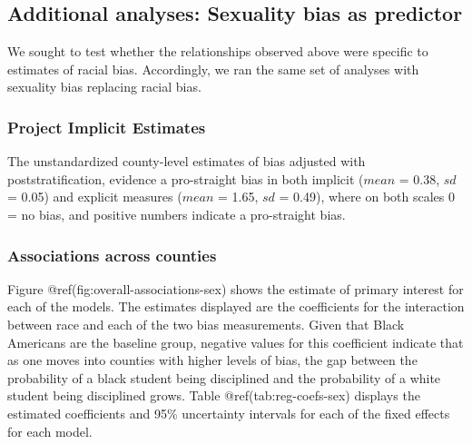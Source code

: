 \documentclass[9pt,twocolumn,twoside,lineno]{pnas-new}
\begin{document}
\subsection{Additional analyses: Sexuality bias as
predictor}\label{additional-analyses-sexuality-bias-as-predictor}

We sought to test whether the relationships observed above were specific
to estimates of racial bias. Accordingly, we ran the same set of
analyses with sexuality bias replacing racial bias.

\subsubsection{Project Implicit
Estimates}\label{project-implicit-estimates-1}

The unstandardized county-level estimates of bias adjusted with
poststratification, evidence a pro-straight bias in both implicit
(\(mean\) = 0.38, \(sd\) = 0.05) and explicit measures (\(mean\) = 1.65,
\(sd\) = 0.49), where on both scales 0 = no bias, and positive numbers
indicate a pro-straight bias.

\subsubsection{Associations across
counties}\label{associations-across-counties-1}

Figure @ref(fig:overall-associations-sex) shows the estimate of primary
interest for each of the models. The estimates displayed are the
coefficients for the interaction between race and each of the two bias
measurements. Given that Black Americans are the baseline group,
negative values for this coefficient indicate that as one moves into
counties with higher levels of bias, the gap between the probability of
a black student being disciplined and the probability of a white student
being disciplined grows. Table @ref(tab:reg-coefs-sex) displays the
estimated coefficients and 95\% uncertainty intervals for each of the
fixed effects for each model.
\end{document}
